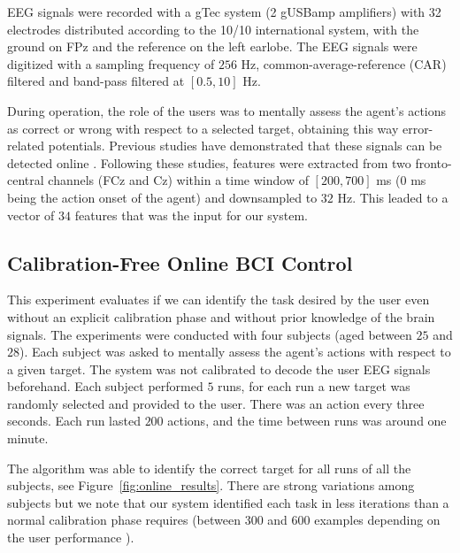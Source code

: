 \documentclass[letterpaper]{article}
\begin{document}
EEG signals were recorded with a gTec system (2 gUSBamp amplifiers) with 32 electrodes distributed according to the 10/10 international system, with the ground on FPz and the reference on the left earlobe. The EEG signals were digitized with a sampling frequency of $256$ Hz, common-average-reference (CAR) filtered and band-pass filtered at $[0.5, 10]$ Hz. 

During operation, the role of the users was to mentally assess the agent's actions as correct or wrong with respect to a selected target, obtaining this way error-related potentials. Previous studies have demonstrated that these signals can be detected online \cite{FerrezErrores}. Following these studies, features were extracted from two fronto-central channels (FCz and Cz) within a time window of $[200,700]$ ms ($0$ ms being the action onset of the agent) and downsampled to $32$ Hz. This leaded to a vector of $34$ features that was the input for our system.

\subsection{Calibration-Free Online BCI Control}

This experiment evaluates if we can identify the task desired by the user even without an explicit calibration phase and without prior knowledge of the brain signals. The experiments were conducted with four subjects (aged between $25$ and $28$). Each subject was asked to mentally assess the agent's actions with respect to a given target. The system was not calibrated to decode the user EEG signals beforehand. Each subject performed $5$ runs, for each run a new target was randomly selected and provided to the user. There was an action every three seconds. Each run lasted $200$ actions, and the time between runs was around one minute.

The algorithm was able to identify the correct target for all runs of all the subjects, see Figure~\ref{fig:online_results}. There are strong variations among subjects but we note that our system identified each task in less iterations than a normal calibration phase requires (between 300 and 600 examples depending on the user performance \cite{chavarriaga2010learning,iturrate2010single}).
\end{document}
